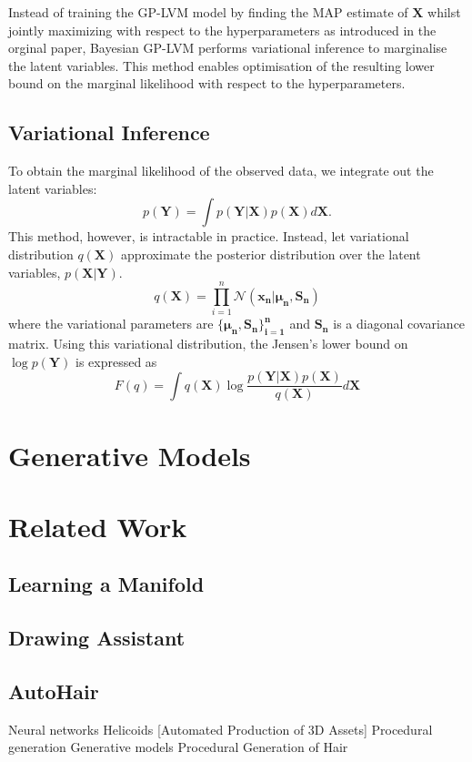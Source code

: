 \documentclass[ %
                    author={Dillon Keith Diep},
                supervisor={Dr. Carl Henrik Ek},
                    degree={MEng},
                     title={Assisted Content Generation for 3D Hair Geometry},
                  subtitle={[INCOMPLETE DRAFT, CONTAINS NOTES FROM RESEARCH]},
                      type={Research},
                      year={2014} ]{dissertation}
\begin{document}
Instead of training the GP-LVM model by finding the MAP estimate of $\mathbf{X}$ whilst jointly maximizing with respect to the hyperparameters as introduced in the orginal paper, Bayesian GP-LVM performs variational inference to marginalise the latent variables. This method enables optimisation of the resulting lower bound on the marginal likelihood with respect to the hyperparameters.

\subsection{Variational Inference}
To obtain the marginal likelihood of the observed data, we integrate out the latent variables:
$$p(\mathbf{Y})=\int p(\mathbf{Y|X})p(\mathbf{X})d\mathbf{X}.$$
This method, however, is intractable in practice. Instead, let variational distribution $q(\mathbf{X})$ approximate the posterior distribution over the latent variables, $p(\mathbf{X|Y})$.
$$q(\mathbf{X})=\prod^n_{i=1}\mathcal{N}(\mathbf{x_n|\mu_n,S_n})$$
where the variational parameters are $\mathbf{ \{ \mu_n,S_n \}^n_{i=1} }$ and $\mathbf{S_n}$ is a diagonal covariance matrix. Using this variational distribution, the Jensen's lower bound on $\log p(\mathbf{Y})$ is expressed as
$$F(q)=\int q(\mathbf{X})\log \frac{ p(\mathbf{Y|X})p(\mathbf{X}) }{ q(\mathbf{X}) } d\mathbf{X}$$


\section{Generative Models}

\section{Related Work}
\subsection{Learning a Manifold}
\cite{fontmanifold}


\subsection{Drawing Assistant}

\subsection{AutoHair}
\cite{autohair}
Neural networks
Helicoids
[Automated Production of 3D Assets]
Procedural generation
Generative models
Procedural Generation of Hair 
\end{document}
